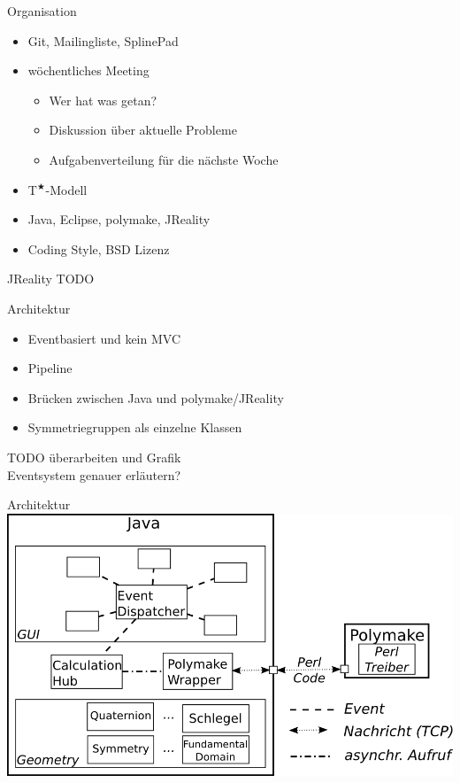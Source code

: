 \documentclass[ucs,11pt]{beamer}
\begin{document}
\begin{frame}{Organisation}
		\begin{itemize}
			\item Git, Mailingliste, SplinePad \pause
			\item wöchentliches Meeting \pause
				\begin{itemize}
					\item Wer hat was getan?
					\item Diskussion über aktuelle Probleme
					\item Aufgabenverteilung für die nächste Woche
				\end{itemize} \pause
			\item T$^\bigstar$-Modell \pause
			\item Java, Eclipse, polymake, JReality \pause
			\item Coding Style, BSD Lizenz
		\end{itemize}
\end{frame}

\begin{frame}{JReality}
TODO
\end{frame}


\begin{frame}{Architektur}
	\begin{itemize}
		\item Eventbasiert und kein MVC \pause
		\item Pipeline \pause
		\item Brücken zwischen Java und polymake/JReality \pause
		\item Symmetriegruppen als einzelne Klassen
	\end{itemize}
TODO überarbeiten und Grafik \\
Eventsystem genauer erläutern?
\end{frame}

\begin{frame}{Architektur}
\includegraphics[width=1\textwidth]{architecture.png}
\end{frame}
\end{document}
